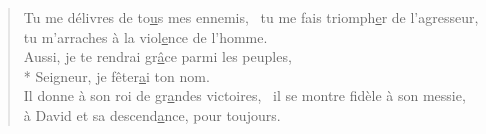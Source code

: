 \begin{verse}
Tu me délivres de to\underline{u}s mes ennemis,~\psalmdagger
tu me fais triomph\underline{e}r de l’agresseur, \\
tu m’arraches à la viol\underline{e}nce de l’homme. \\

Aussi, je te rendrai gr\underline{â}ce parmi les peuples, \\*
Seigneur, je fêter\underline{a}i ton nom. \\
Il donne à son roi de gr\underline{a}ndes victoires,~\psalmstar
il se montre fidèle à son messie, \\
à David et sa descend\underline{a}nce, pour toujours. \\
\end{verse}

